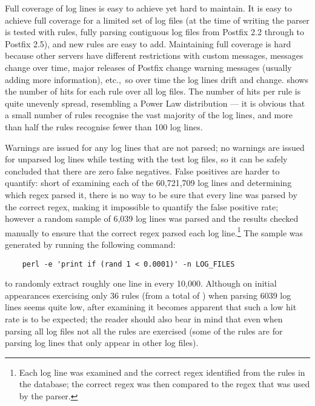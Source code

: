 Full coverage of log lines is easy to achieve yet hard to maintain.  It is
easy to achieve full coverage for a limited set of log files (at the time
of writing the parser is tested with \numberOFrules{} rules, fully parsing
\numberOFlogFILESall{} contiguous log files from Postfix 2.2 through to
Postfix 2.5), and new rules are easy to add.  Maintaining full coverage is
hard because other servers have different restrictions with custom
messages,  messages change over time, major releases of
Postfix change warning messages (usually adding more information), etc.,\
so over time the log lines drift and change.  
shows the number of hits for each rule over all \numberOFlogFILES{} log
files.  The number of hits per rule is quite unevenly spread, resembling a
Power Law distribution --- it is obvious that a small number of rules
recognise the vast majority of the log lines, and more than half the rules
recognise fewer than 100 log lines.

Warnings are issued for any log lines that are not parsed; no warnings are
issued for unparsed log lines while testing with the \numberOFlogFILES{}
test log files, so it can be safely concluded that there are zero false
negatives.  False positives are harder to quantify: short of examining each
of the 60,721,709 log lines and determining which regex parsed it, there
is no way to be sure that every line was parsed by the correct regex,
making it impossible to quantify the false positive rate; however a random
sample of 6,039 log lines was parsed and the results checked manually to
ensure that the correct regex parsed each log line.\footnote{Each log
line was examined and the correct regex identified from the
\numberOFrules{} rules in the database; the correct regex was then
compared to the regex that was used by the parser.}  The sample was
generated by running the following command:

\verb!    perl -e 'print if (rand 1 < 0.0001)' -n LOG_FILES!

\noindent{}to randomly extract roughly one line in every 10,000.  Although
on initial appearances exercising only 36 rules (from a total of
\numberOFrules{}) when parsing 6039 log lines seems quite low, after
examining \graphref{rule hits graph} it becomes apparent that such
a low hit rate is to be expected; the reader should also bear in mind that
even when parsing all \numberOFlogFILES{} log files not all the rules are
exercised (some of the rules are for parsing log lines that only appear in
other log files).

